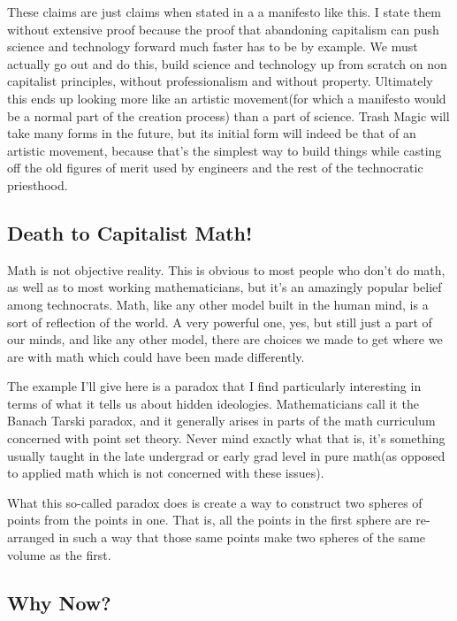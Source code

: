 These claims are just claims when stated in a a manifesto like this. I
state them without extensive proof because the proof that abandoning
capitalism can push science and technology forward much faster has to be
by example. We must actually go out and do this, build science and
technology up from scratch on non capitalist principles, without
professionalism and without property. Ultimately this ends up looking
more like an artistic movement(for which a manifesto would be a normal
part of the creation process) than a part of science. Trash Magic will
take many forms in the future, but its initial form will indeed be that
of an artistic movement, because that's the simplest way to build things
while casting off the old figures of merit used by engineers and the
rest of the technocratic priesthood.

\subsection{Death to Capitalist Math!}\label{death-to-capitalist-math}

Math is not objective reality. This is obvious to most people who don't
do math, as well as to most working mathematicians, but it's an
amazingly popular belief among technocrats. Math, like any other model
built in the human mind, is a sort of reflection of the world. A very
powerful one, yes, but still just a part of our minds, and like any
other model, there are choices we made to get where we are with math
which could have been made differently.

The example I'll give here is a paradox that I find particularly
interesting in terms of what it tells us about hidden ideologies.
Mathematicians call it the Banach Tarski paradox, and it generally
arises in parts of the math curriculum concerned with point set theory.
Never mind exactly what that is, it's something usually taught in the
late undergrad or early grad level in pure math(as opposed to applied
math which is not concerned with these issues).

What this so-called paradox does is create a way to construct two
spheres of points from the points in one. That is, all the points in the
first sphere are re-arranged in such a way that those same points make
two spheres of the same volume as the first.

\subsection{Why Now?}\label{why-now}

